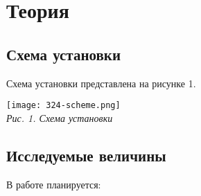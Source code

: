 

\newcommand{\formula}[3]
{
    \noindent#1\\[0.1cm]
    \begin{equation}\label{#2}
        #3
    \end{equation}
}

\newcommand{\mth}[1]
{
    \begin{math}
        #1
    \end{math}
}

\newcommand{\ruB}[1]
{
    _{\text{#1}}
}

\section{Теория}

\subsection {Схема установки}

Схема установки представлена на рисунке 1.

\begin{center}

    \texttt{[image: 324-scheme.png]} \\
    \textit{Рис. 1. Схема установки}

\end{center}

\subsection {Исследуемые величины}

В работе планируется:

